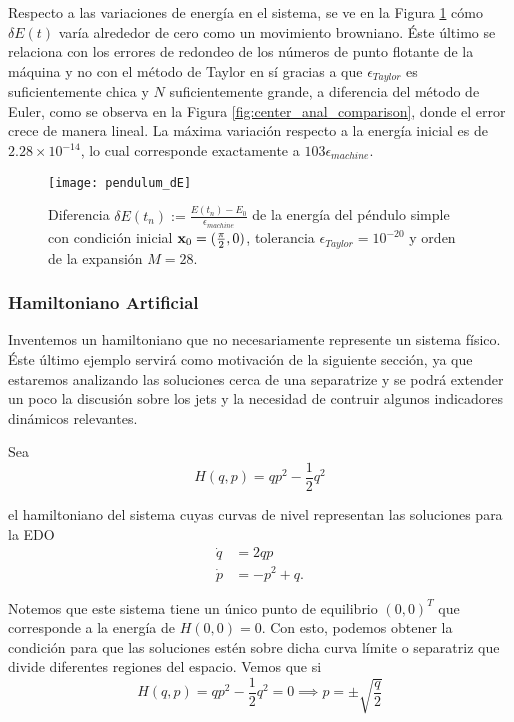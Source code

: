 Respecto a las variaciones de energía en el sistema, se ve en la Figura \ref{fig:pendulum_dE} cómo $\delta E(t)$ varía alrededor de cero como un movimiento browniano. Éste último se relaciona con los errores de redondeo de los números de punto flotante de la máquina y no con el método de Taylor en sí gracias a que $\epsilon_{Taylor}$ es suficientemente chica y $N$ suficientemente grande, a diferencia del método de Euler, como se observa en la Figura \ref{fig:center_anal_comparison}, donde el error crece de manera lineal. La máxima variación respecto a la energía inicial es de $2.28\times10^{-14}$, lo cual corresponde exactamente a $103 \epsilon_{machine}$.

\begin{figure}[h!]
 \centering
 \texttt{[image: pendulum\_dE]}
 \caption{Diferencia $\delta E(t_n) := \frac{E(t_n) - E_0}{\epsilon_{machine}}$ de la energía del péndulo simple con condición inicial $\mathbf{x}_0 = (\frac{\pi}{2},0)$, tolerancia $\epsilon_{Taylor} = 10^{-20}$ y orden de la expansión $M = 28$.}
 \label{fig:pendulum_dE}
\end{figure}

\subsubsection{Hamiltoniano Artificial}
\label{sec:artificial_ham}

Inventemos un hamiltoniano que no necesariamente represente un sistema físico. Éste último ejemplo servirá como motivación de la siguiente sección, ya que estaremos analizando las soluciones cerca de una separatrize y se podrá extender un poco la discusión sobre los jets y la necesidad de contruir algunos indicadores dinámicos relevantes. 

Sea 
\begin{equation}
 H(q,p) = qp^2 - \frac{1}{2}q^2
 \label{eq:artificial_ham}
\end{equation}

el hamiltoniano del sistema cuyas curvas de nivel representan las soluciones para la EDO
\begin{align}
 \dot{q} &= 2qp \nonumber \\
 \dot{p} &= -p^2 + q.
 \label{eq:artificial_ode}
\end{align}


Notemos que este sistema tiene un único punto de equilibrio $(0,0)^T$ que corresponde a la energía de $H(0,0) = 0$. Con esto, podemos obtener la condición para que las soluciones estén sobre dicha curva límite o separatriz que divide diferentes regiones del espacio. Vemos que si
\begin{equation*}
 H(q,p) = qp^2 - \frac{1}{2}q^2 = 0 \implies p = \pm \sqrt{\frac{q}{2}} 
\end{equation*}

